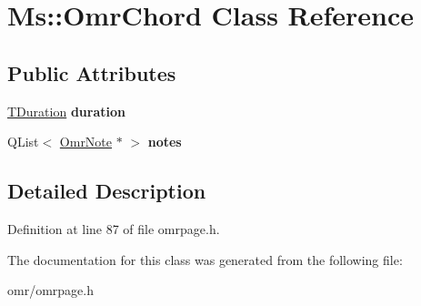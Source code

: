 \hypertarget{class_ms_1_1_omr_chord}{}\section{Ms\+:\+:Omr\+Chord Class Reference}
\label{class_ms_1_1_omr_chord}
\subsection*{Public Attributes}
\begin{DoxyCompactItemize}
\item 
\mbox{\label{class_ms_1_1_omr_chord_a120c07d25f00136fd4f410a434b3067a}} 
\hyperlink{class_ms_1_1_t_duration}{T\+Duration} {\bfseries duration}
\item 
\mbox{\label{class_ms_1_1_omr_chord_a9eabb2bb4db2a89ffa4c9f296d2a7fd8}} 
Q\+List$<$ \hyperlink{class_ms_1_1_omr_note}{Omr\+Note} $\ast$ $>$ {\bfseries notes}
\end{DoxyCompactItemize}


\subsection{Detailed Description}


Definition at line 87 of file omrpage.\+h.



The documentation for this class was generated from the following file\+:\begin{DoxyCompactItemize}
\item 
omr/omrpage.\+h\end{DoxyCompactItemize}
